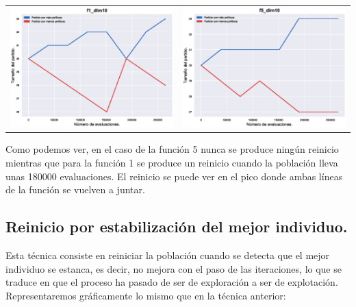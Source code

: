 \documentclass[12pt]{article}
\numberwithin{figure}{section} %
\numberwithin{table}{section} %
\begin{document}
	\begin{table}[H]
	\centering
	\begin{tabular}{ll}
	\includegraphics[width=0.5\linewidth]{./images/restart_percentage_f1_dim10.eps} & \includegraphics[width=0.5\linewidth]{./images/restart_percentage_f5_dim10.eps} \\
	\end{tabular}
	\end{table}
	
	Como podemos ver, en el caso de la función 5 nunca se produce ningún reinicio  mientras que para la función 1 se produce un reinicio cuando la población lleva unas 180000 evaluaciones. El reinicio se puede ver en el pico donde ambas líneas de la función se vuelven a juntar.
	
	\subsection[Reinicio por estabilización del mejor individuo.]{Reinicio por estabilización del mejor individuo.}
	
	Esta técnica consiste en reiniciar la población cuando se detecta que el mejor individuo se estanca, es decir, no mejora con el paso de las iteraciones, lo que se traduce en que el proceso ha pasado de ser de exploración a ser de explotación. Representaremos gráficamente lo mismo que en la técnica anterior:
	
\end{document}
